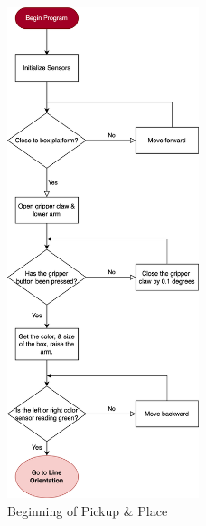 \documentclass[12pt]{report}
\begin{document}
\begin{figure}[H]
    \centering
    \includegraphics[width=0.5\textwidth]{Images/flowchart/begin.pdf}
    \caption{Beginning of Pickup \& Place}
    \label{fig:fc:begin}
\end{figure}
\end{document}
